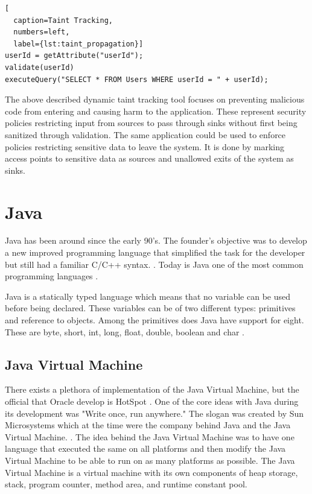 \hfill
\begin{lstlisting}[
  caption=Taint Tracking,
  numbers=left,
  label={lst:taint_propagation}]
userId = getAttribute("userId");
validate(userId)
executeQuery("SELECT * FROM Users WHERE userId = " + userId);
\end{lstlisting}
\hfill

The above described dynamic taint tracking tool focuses on preventing malicious code from entering and causing harm to the application. These represent security policies restricting input from sources to pass through sinks without first being sanitized through validation. The same application could be used to enforce policies restricting sensitive data to leave the system. It is done by marking access points to sensitive data as sources and unallowed exits of the system as sinks.



\section{Java}
\label{JavaInstrumentation}
Java has been around since the early 90's. The founder's objective was to develop a new improved programming language that simplified the task for the developer but still had a familiar C/C++ syntax. \parencite{OracleVoice}. Today is Java one of the most common programming languages \parencite{octoverse}.

Java is a statically typed language which means that no variable can be used before being declared. These variables can be of two different types: primitives and reference to objects. Among the primitives does Java have support for eight. These are byte, short, int, long, float, double, boolean and char \parencite{primjav}.



\subsection{Java Virtual Machine}
There exists a plethora of implementation of the Java Virtual Machine, but the official that Oracle develop is HotSpot \parencite{hotSpot}. One of the core ideas with Java during its development was "Write once, run anywhere." The slogan was created by Sun Microsystems which at the time were the company behind Java and the Java Virtual Machine. \parencite{Craig_2006}. The idea behind the Java Virtual Machine was to have one language that executed the same on all platforms and then modify the Java Virtual Machine to be able to run on as many platforms as possible. The Java Virtual Machine is a virtual machine with its own components of heap storage, stack, program counter, method area, and runtime constant pool.

